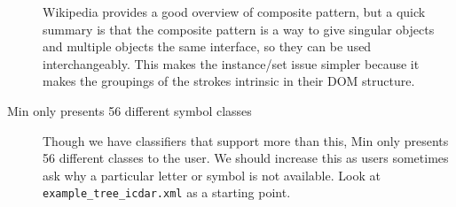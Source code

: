 \documentclass[letterpaper]{article}
\begin{document}
\begin{description}
        Wikipedia provides a good overview of composite pattern, but a quick
        summary is that the composite pattern is a way to give singular objects
        and multiple objects the same interface, so they can be used
        interchangeably. This makes the instance/set issue simpler because it
        makes the groupings of the strokes intrinsic in their DOM structure.  %
    \item[Min only presents 56 different symbol classes] Though we have
         classifiers that support more than this, Min only presents 56 different
         classes to the user. We should increase this as users sometimes ask why a
         particular letter or symbol is not available. Look at
         \verb+example_tree_icdar.xml+ as a starting point.
       
\end{description}
\end{document}
